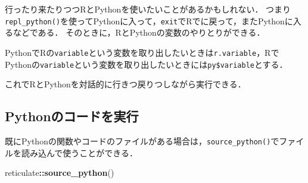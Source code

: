 \documentclass[
]{article}
\newenvironment{Shaded}{\begin{snugshade}}{\end{snugshade}}
\newcommand{\AttributeTok}[1]{\textcolor[rgb]{0.13,0.29,0.53}{#1}}
\newcommand{\CommentTok}[1]{\textcolor[rgb]{0.56,0.35,0.01}{\textit{#1}}}
\newcommand{\ConstantTok}[1]{\textcolor[rgb]{0.56,0.35,0.01}{#1}}
\newcommand{\DocumentationTok}[1]{\textcolor[rgb]{0.56,0.35,0.01}{\textbf{\textit{#1}}}}
\newcommand{\ErrorTok}[1]{\textcolor[rgb]{0.64,0.00,0.00}{\textbf{#1}}}
\newcommand{\FunctionTok}[1]{\textcolor[rgb]{0.13,0.29,0.53}{\textbf{#1}}}
\newcommand{\NormalTok}[1]{#1}
\newcommand{\OtherTok}[1]{\textcolor[rgb]{0.56,0.35,0.01}{#1}}
\newcommand{\SpecialCharTok}[1]{\textcolor[rgb]{0.81,0.36,0.00}{\textbf{#1}}}
\newcommand{\StringTok}[1]{\textcolor[rgb]{0.31,0.60,0.02}{#1}}
\begin{document}
行ったり来たりつつRとPythonを使いたいことがあるかもしれない．
つまり\texttt{repl\_python()}を使ってPythonに入って，\texttt{exit}でRでに戻って，またPythonに入るなどである．
そのときに，RとPythonの変数のやりとりができる．

PythonでRの\texttt{variable}という変数を取り出したいときは\texttt{r.variable}，RでPythonの\texttt{variable}という変数を取り出したいときには\texttt{py\$variable}とする．

\begin{Shaded}
\end{Shaded}

これでRとPythonを対話的に行きつ戻りつしながら実行できる．

\begin{Shaded}
\end{Shaded}

\hypertarget{pythonux306eux30b3ux30fcux30c9ux3092ux5b9fux884c}{%
\subsection{Pythonのコードを実行}\label{pythonux306eux30b3ux30fcux30c9ux3092ux5b9fux884c}}

既にPythonの関数やコードのファイルがある場合は，\texttt{source\_python()}でファイルを読み込んで使うことができる．

\begin{Shaded}
\begin{Highlighting}[]
\NormalTok{reticulate}\SpecialCharTok{::}\FunctionTok{source\_python}\NormalTok{()}
\end{Highlighting}
\end{Shaded}
\end{document}
